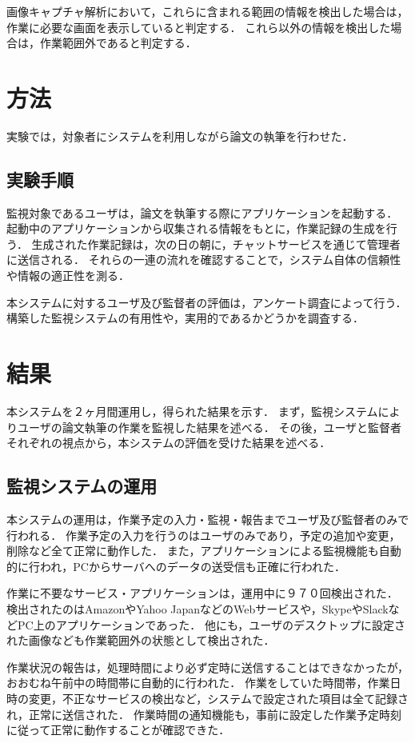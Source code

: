 画像キャプチャ解析において，これらに含まれる範囲の情報を検出した場合は，作業に必要な画面を表示していると判定する．
これら以外の情報を検出した場合は，作業範囲外であると判定する．

\section{方法}
実験では，対象者にシステムを利用しながら論文の執筆を行わせた．

\subsection{実験手順}
監視対象であるユーザは，論文を執筆する際にアプリケーションを起動する．
起動中のアプリケーションから収集される情報をもとに，作業記録の生成を行う．
生成された作業記録は，次の日の朝に，チャットサービスを通じて管理者に送信される．
それらの一連の流れを確認することで，システム自体の信頼性や情報の適正性を測る．

本システムに対するユーザ及び監督者の評価は，アンケート調査によって行う．
構築した監視システムの有用性や，実用的であるかどうかを調査する．

\section{結果}
本システムを２ヶ月間運用し，得られた結果を示す．
まず，監視システムによりユーザの論文執筆の作業を監視した結果を述べる．
その後，ユーザと監督者それぞれの視点から，本システムの評価を受けた結果を述べる．

\subsection{監視システムの運用}
本システムの運用は，作業予定の入力・監視・報告までユーザ及び監督者のみで行われる．
作業予定の入力を行うのはユーザのみであり，予定の追加や変更，削除など全て正常に動作した．
また，アプリケーションによる監視機能も自動的に行われ，PCからサーバへのデータの送受信も正確に行われた．

作業に不要なサービス・アプリケーションは，運用中に９７０回検出された．
検出されたのはAmazonやYahoo JapanなどのWebサービスや，SkypeやSlackなどPC上のアプリケーションであった．
他にも，ユーザのデスクトップに設定された画像なども作業範囲外の状態として検出された．

作業状況の報告は，処理時間により必ず定時に送信することはできなかったが，おおむね午前中の時間帯に自動的に行われた．
作業をしていた時間帯，作業日時の変更，不正なサービスの検出など，システムで設定された項目は全て記録され，正常に送信された．
作業時間の通知機能も，事前に設定した作業予定時刻に従って正常に動作することが確認できた．

